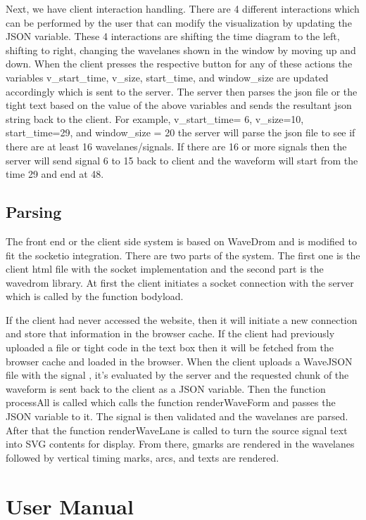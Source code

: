\documentclass[14pt]{extarticle}
\begin{document}
 \par Next, we have client interaction handling. There are 4 different interactions which can be performed by the user that can modify the visualization by updating the JSON variable. These 4 interactions are shifting the time diagram to the left, shifting to right, changing the wavelanes shown in the window by moving up and down. When the client presses the respective button for any of these actions the variables v\_start\_time, v\_size, start\_time, and window\_size are updated accordingly which is sent to the server. The server then parses the json file or the tight text based on the value of the above variables and sends the resultant json string back to the client. For example, v\_start\_time= 6, v\_size=10, start\_time=29, and window\_size = 20 the server will parse the json file to see if there are at least 16 wavelanes/signals. If there are 16 or more signals then the server will send signal 6 to 15 back to client and the waveform will start from the time 29 and end at 48.

\subsection{Parsing}
 The front end or the client side system is based on WaveDrom and is modified to fit the socketio integration. There are two parts of the system. The first one is the client html file with the socket implementation and the second part is the wavedrom library. At first the client initiates a socket connection with the server which is called by the function bodyload. 
 \par If the client had never accessed the website, then it will initiate a new connection and store that information in the browser cache. If the client had previously uploaded a file or tight code in the text box then it will be fetched from the browser cache and loaded in the browser. When the client uploads a WaveJSON file with the signal , it’s evaluated by the server and the requested chunk of the waveform is sent back to the client as a JSON variable. Then the function processAll is called which calls the function renderWaveForm and passes the JSON variable to it. The signal is then validated and the wavelanes are parsed. After that the function renderWaveLane is called to turn the source signal text into SVG contents for display. From there, gmarks are rendered in the  wavelanes followed by vertical timing marks, arcs, and texts are rendered.

\section{User Manual}
\end{document}
